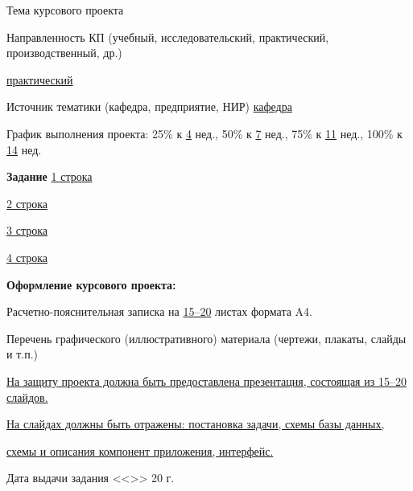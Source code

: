 \begin{titlepage}
\begin{center}
    Тема курсового проекта
    \uline{\hfill\wthemea\hfill}

    \uline{\hfill\wthemeb\hfill}

    \uline{\hfill\wthemec\hfill}

    {\flushleft%
    Направленность КП (учебный, исследовательский, практический,
    производственный, др.)
    \hfill}

    \uline{\hfill
        практический
    \hfill}

    Источник тематики (кафедра, предприятие, НИР)
    \uline{\hfill
        кафедра
    \hfill}

    График выполнения проекта:
        25\% к \uline{\hfill4\hfill} нед.,
        50\% к \uline{\hfill7\hfill} нед.,
        75\% к \uline{\hfill11\hfill} нед.,
        100\% к \uline{\hfill14\hfill} нед.

    \textbf{Задание}
    \uline{\hfill
	    1 строка
    \hfill}

    \uline{\hfill
	    2 строка
    \hfill}

    \uline{\hfill
	    3 строка
    \hfill}

    \uline{\hfill
	    4 строка
    \hfill}

    {\flushleft%
    \textbf{Оформление курсового проекта:}
    \hfill}

    {\flushleft%
    Расчетно-пояснительная записка на
    \uline{\hspace{1em}15--20\hspace{1em}}
    листах формата A4.
    \hfill}

    {\flushleft%
        Перечень графического (иллюстративного) материала
        (чертежи, плакаты, слайды и т.п.)
    \hfill}

    \uline{\hfill
        На защиту проекта должна быть предоставлена презентация,
        состоящая из 15--20 слайдов.
    \hfill}

    \uline{\hfill
        На слайдах должны быть отражены: постановка задачи,
        схемы базы данных,
    \hfill}

    \uline{\hfill
        схемы и описания компонент приложения, интерфейс.
    \hfill}

    \uline{\hfill\hfill}


    {\flushleft%
        Дата выдачи задания <<\hspace{1.5em}>>
        \uline{\hspace{4em}}
        20\uline{\hspace{1em}} г.
    \hfill}


\end{center}
\end{titlepage}
